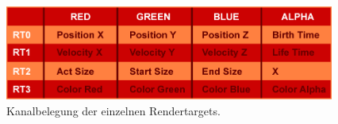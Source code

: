 \begin{Spacing}{\mylinespace}
\begin{figure}[h!]
	\centering
	\vspace*{30px}
	\includegraphics[width=410px]{graphics/RendertargetsChannels.png}
	\caption{Kanalbelegung der einzelnen Rendertargets.}
	\label{fig:RTCahnnels}
\end{figure}

\end{Spacing}
\newpage
\clearpage
